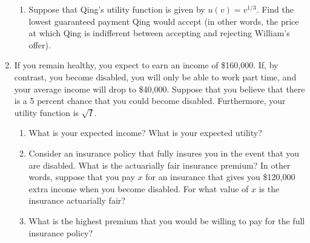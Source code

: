 \documentclass[11pt]{article}
\begin{document}
\begin{enumerate}
\begin{enumerate}
	\item Suppose that Qing's utility function is given by $u(v)=v^{1/3}$. Find the lowest guaranteed payment Qing would accept (in other words, the price at which Qing is indifferent between accepting and rejecting William's offer).
    \end{enumerate}

\item If you remain healthy, you expect to earn an income of \$160,000. If, by contrast, you become disabled, you will only be able to work part time, and your average income will drop to \$40,000. Suppose that you believe that there is a 5 percent chance that you could become disabled. Furthermore, your utility function is $\sqrt{I}$.
    \begin{enumerate}
    \item What is your expected income? What is your expected utility?

    \item Consider an insurance policy that fully insures you in the event that you are disabled. What is the actuarially fair insurance premium? In other words, suppose that you pay $x$ for an insurance that gives you \$120,000 extra income when you become disabled. For what value of $x$ is the insurance actuarially fair?

    \item What is the highest premium that you would be willing to pay for the full insurance policy?
    \end{enumerate}

\end{enumerate}
\end{document}
